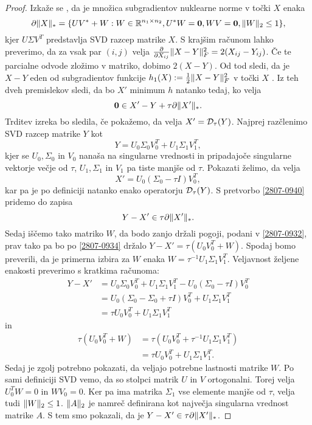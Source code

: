 \begin{proof}
Izkaže se \cite{CCS}, da je množica subgradientov nuklearne norme v točki $X$ enaka
\begin{equation}  \label{2807-0932}  
    \partial\lVert X\rVert_* = \{UV^* + W: W \in \mathbb{R}^{n_1 \times n_2}, U^*W = \mathbf{0}, WV = \mathbf{0}, \lVert W\rVert_2 \leq 1 \},
\end{equation}
kjer $U \Sigma V^T$ predstavlja SVD razcep matrike $X$. S krajšim računom lahko preverimo, da za vsak par $(i,j)$ velja $\frac{\partial}{\partial X_{ij}}\lVert X-Y\rVert_F^2 = 2(X_{ij} - Y_{ij})$. 
Če te parcialne odvode zložimo v matriko, dobimo $2(X-Y)$. Od tod sledi, da je $X-Y$ eden od subgradientov funkcije $h_1(X):=\frac{1}{2}\lVert X-Y\rVert_F^2$ v točki $X$ \cite[3.1.3]{boyd2004convex}.
Iz teh dveh premislekov sledi, da bo $X'$ minimum $h$ natanko tedaj, ko velja 
\begin{equation} \label{2807-0940}
    \mathbf{0} \in X' - Y + \tau \partial\lVert X'\rVert_*.
\end{equation}
Trditev izreka bo sledila, če pokažemo, da velja $X' = \mathcal{D}_\tau(Y)$. Najprej razčlenimo SVD razcep matrike $Y$ kot 
\[
    Y = U_0\Sigma_0V_0^T + U_1\Sigma_1V_1^T,
\]
kjer se $U_0, \Sigma_0$ in $V_0$ nanaša na singularne vrednosti in pripadajoče singularne vektorje večje od $\tau$, $U_1, \Sigma_1$ in $V_1$ pa tiste manjše od $\tau$. Pokazati želimo, da velja 
\[
    X' = U_0(\Sigma_0 - \tau I)V_0^T,
\] 
kar pa je po definiciji natanko enako operatorju $\mathcal{D}_\tau(Y)$. S pretvorbo \eqref{2807-0940} pridemo do zapisa
\begin{equation} \label{2807-0934}
    Y- X' \in \tau \partial \lVert X'\rVert_*.
\end{equation}
Sedaj iščemo tako matriko $W$, da bodo zanjo držali pogoji, podani v \eqref{2807-0932}, prav tako pa bo po \eqref{2807-0934} držalo $Y - X' = \tau (U_0V_0^T + W)$. Spodaj bomo preverili, da je primerna izbira za $W$ enaka $W= \tau^{-1} U_1 \Sigma_1 V_1^T$. 
Veljavnost željene enakosti
preverimo s kratkima računoma:
\begin{align*}
    Y-X' &= U_0\Sigma_0V_0^T + U_1\Sigma_1V_1^T - U_0(\Sigma_0 - \tau I)V_0^T \\ 
    &= U_0(\Sigma_0 - \Sigma_0 + \tau I)V_0^T + U_1\Sigma_1 V_1^T  \\
    &= \tau U_0 V_0^T + U_1\Sigma_1 V_1^T
\end{align*}
in 
\begin{align*}
    \tau(U_0 V_0^T + W) &= \tau(U_0V_0^T + \tau^{-1} U_1 \Sigma_1 V_1^T)\\ 
    &= \tau U_0 V_0^T + U_1 \Sigma_1 V_1^T. 
\end{align*}
Sedaj je zgolj potrebno pokazati, da veljajo potrebne lastnosti matrike $W$.
Po sami definiciji SVD vemo, da so stolpci matrik $U$ in $V$ ortogonalni. Torej velja $U_0^TW = 0$ in $WV_0 = 0$. Ker pa ima matrika $\Sigma_1$ vse elemente manjše od $\tau$, velja tudi $\lVert W\rVert_2 \leq 1$. $\lVert A\rVert_2$ je namreč definirana kot največja singularna vrednost matrike $A$. S tem smo pokazali, da je $Y - X' \in \tau \partial \lVert X'\rVert_*$.
\end{proof}
